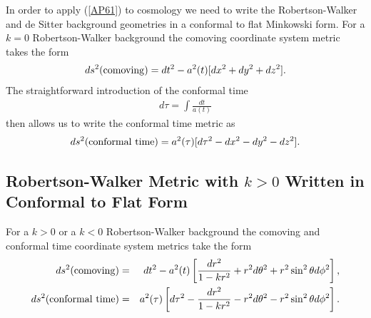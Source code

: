 \documentclass[aps]{revtex4}
\begin{document}
In order to apply (\ref{AP61}) to cosmology we need to write the Robertson-Walker and de Sitter background geometries in a conformal to flat Minkowski form. For a $k=0$ Robertson-Walker background the comoving coordinate system metric takes the form
% 
\begin{eqnarray}
ds^2({\rm comoving})=dt^2-a^2(t)[dx^2+dy^2+dz^2].
\label{A1}
\end{eqnarray}
%
The straightforward introduction of the conformal time
% 
\begin{eqnarray}
d\tau=\int \frac{dt}{a(t)}
\label{A2}
\end{eqnarray}
%
then allows us to write the conformal time metric as
% 
\begin{eqnarray}
ds^2({\rm conformal~time})=a^2(\tau)[d\tau^2-dx^2-dy^2-dz^2].
\label{A3}
\end{eqnarray}
%

\subsection{Robertson-Walker Metric with $k>0$  Written in Conformal to Flat Form}

For a $k>0$ or a $k<0$ Robertson-Walker background the comoving and conformal time coordinate system metrics take the form
% 
\begin{eqnarray}
ds^2({\rm comoving})&=&dt^2-a^2(t)\left[\frac{dr^2}{1-kr^2}+r^2d\theta^2+r^2\sin^2\theta d\phi^2\right],
\nonumber\\
ds^2({\rm conformal~time})&=&a^2(\tau)\left[d\tau^2-\frac{dr^2}{1-kr^2}-r^2d\theta^2-r^2\sin^2\theta d\phi^2\right].
\label{A4}
\end{eqnarray}
%
\end{document}
